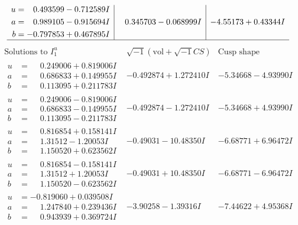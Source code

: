 \documentclass[1p]{elsarticle_modified}
\theoremstyle{definition}
\newcommand{\I}{\sqrt{-1}}
\begin{document}
$$\begin{array}{c|c|c}
\begin{aligned}
u &= \phantom{-}0.493599 - 0.712589 I \\
a &= \phantom{-}0.989105 - 0.915694 I \\
b &= -0.797853 + 0.467895 I\end{aligned}
 & \phantom{-}0.345703 - 0.068999 I & -4.55173 + 0.43344 I\\
 \hline 
 \end{array}$$\newpage$$\begin{array}{c|c|c}  
\text{Solutions to }I^u_{1}& \I (\text{vol} + \sqrt{-1}CS) & \text{Cusp shape}\\
 \hline 
\begin{aligned}
u &= \phantom{-}0.249006 + 0.819006 I \\
a &= \phantom{-}0.686833 + 0.149955 I \\
b &= \phantom{-}0.113095 + 0.211783 I\end{aligned}
 & -0.492874 + 1.272410 I & -5.34668 - 4.93990 I \\ \hline\begin{aligned}
u &= \phantom{-}0.249006 - 0.819006 I \\
a &= \phantom{-}0.686833 - 0.149955 I \\
b &= \phantom{-}0.113095 - 0.211783 I\end{aligned}
 & -0.492874 - 1.272410 I & -5.34668 + 4.93990 I \\ \hline\begin{aligned}
u &= \phantom{-}0.816854 + 0.158141 I \\
a &= \phantom{-}1.31512 - 1.20053 I \\
b &= \phantom{-}1.150520 + 0.623562 I\end{aligned}
 & -0.49031 - 10.48350 I & -6.68771 + 6.96472 I \\ \hline\begin{aligned}
u &= \phantom{-}0.816854 - 0.158141 I \\
a &= \phantom{-}1.31512 + 1.20053 I \\
b &= \phantom{-}1.150520 - 0.623562 I\end{aligned}
 & -0.49031 + 10.48350 I & -6.68771 - 6.96472 I \\ \hline\begin{aligned}
u &= -0.819060 + 0.039508 I \\
a &= \phantom{-}1.247840 + 0.239436 I \\
b &= \phantom{-}0.943939 + 0.369724 I\end{aligned}
 & -3.90258 - 1.39316 I & -7.44622 + 4.95368 I \\ \hline\begin{aligned}

\end{aligned}
\end{array}$$
\end{document}
